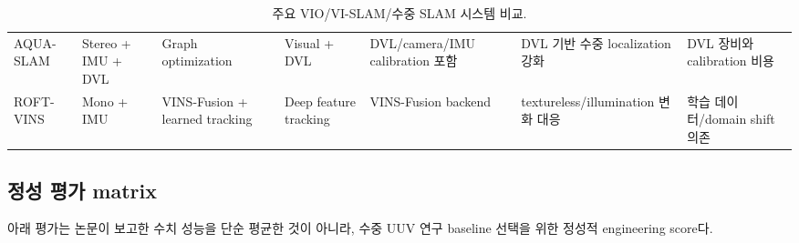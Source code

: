 \documentclass[11pt,a4paper]{article}
\begin{document}
\begin{landscape}
\begin{table}[p]
\begin{tabularx}{\linewidth}{p{27mm}p{24mm}p{25mm}p{30mm}p{34mm}p{39mm}Y}
AQUA-SLAM & Stereo + IMU + DVL & Graph optimization & Visual + DVL & DVL/camera/IMU calibration 포함 & DVL 기반 수중 localization 강화 & DVL 장비와 calibration 비용 \\
ROFT-VINS & Mono + IMU & VINS-Fusion + learned tracking & Deep feature tracking & VINS-Fusion backend & textureless/illumination 변화 대응 & 학습 데이터/domain shift 의존 \\
\bottomrule
\end{tabularx}
\caption{주요 VIO/VI-SLAM/수중 SLAM 시스템 비교.}
\end{table}
\end{landscape}

\subsection{정성 평가 matrix}

아래 평가는 논문이 보고한 수치 성능을 단순 평균한 것이 아니라, 수중 UUV 연구 baseline 선택을 위한 정성적 engineering score다.
\end{document}
